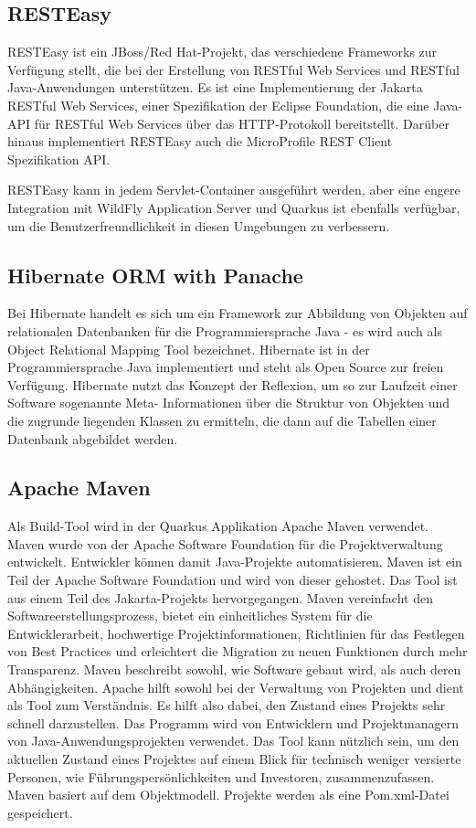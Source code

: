 \subsection{RESTEasy}

RESTEasy ist ein JBoss/Red Hat-Projekt, das verschiedene Frameworks zur Verfügung stellt, die bei der Erstellung von RESTful Web Services und RESTful Java-Anwendungen unterstützen. 
Es ist eine Implementierung der Jakarta RESTful Web Services, einer Spezifikation der Eclipse Foundation, die eine Java-API für RESTful Web Services über das HTTP-Protokoll bereitstellt.
Darüber hinaus implementiert RESTEasy auch die MicroProfile REST Client Spezifikation API.

RESTEasy kann in jedem Servlet-Container ausgeführt werden, aber eine engere Integration mit WildFly Application Server und Quarkus 
ist ebenfalls verfügbar, um die Benutzerfreundlichkeit in diesen Umgebungen zu verbessern.
\cite{sysarch-quarkus-2}

\subsection{Hibernate ORM with Panache}

Bei Hibernate handelt es sich um ein Framework zur Abbildung von Objekten auf relationalen Datenbanken für die Programmiersprache Java - es wird auch als Object Relational Mapping Tool bezeichnet. 
Hibernate ist in der Programmiersprache Java implementiert und steht als Open Source zur freien Verfügung. Hibernate nutzt das Konzept der Reflexion, um so zur Laufzeit einer Software sogenannte 
Meta- Informationen über die Struktur von Objekten und die zugrunde liegenden Klassen zu ermitteln, die dann auf die Tabellen einer Datenbank abgebildet werden.
\cite{sysarch-quarkus-3}

\subsection{Apache Maven}

Als Build-Tool wird in der Quarkus Applikation Apache Maven verwendet. Maven wurde von der Apache Software Foundation für die Projektverwaltung entwickelt. 
Entwickler können damit Java-Projekte automatisieren. Maven ist ein Teil der Apache Software Foundation und wird von dieser gehostet. 
Das Tool ist aus einem Teil des Jakarta-Projekts hervorgegangen. Maven vereinfacht den Softwareerstellungsprozess, bietet ein einheitliches System für die Entwicklerarbeit, hochwertige Projektinformationen, 
Richtlinien für das Festlegen von Best Practices und erleichtert die Migration zu neuen Funktionen durch mehr Transparenz. Maven beschreibt sowohl, wie Software gebaut wird, als auch deren Abhängigkeiten. 
Apache hilft sowohl bei der Verwaltung von Projekten und dient als Tool zum Verständnis. Es hilft also dabei, den Zustand eines Projekts sehr schnell darzustellen.
Das Programm wird von Entwicklern und Projektmanagern von Java-Anwendungsprojekten verwendet. Das Tool kann nützlich sein, um den aktuellen Zustand eines Projektes 
auf einem Blick für technisch weniger versierte Personen, wie Führungspersönlichkeiten und Investoren, zusammenzufassen. Maven basiert auf dem Objektmodell. 
Projekte werden als eine Pom.xml-Datei gespeichert. 

